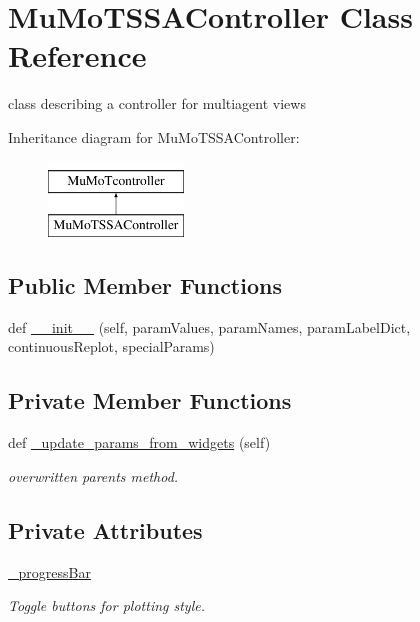 \hypertarget{class_mu_mo_t_1_1_mu_mo_t_s_s_a_controller}{}\section{Mu\+Mo\+T\+S\+S\+A\+Controller Class Reference}
\label{class_mu_mo_t_1_1_mu_mo_t_s_s_a_controller}


class describing a controller for multiagent views  


Inheritance diagram for Mu\+Mo\+T\+S\+S\+A\+Controller\+:\begin{figure}[H]
\begin{center}
\leavevmode
\includegraphics[height=2.000000cm]{class_mu_mo_t_1_1_mu_mo_t_s_s_a_controller}
\end{center}
\end{figure}
\subsection*{Public Member Functions}
\begin{DoxyCompactItemize}
\item 
def \hyperlink{class_mu_mo_t_1_1_mu_mo_t_s_s_a_controller_a203e76c007a565312c5715712851aadb}{\+\_\+\+\_\+init\+\_\+\+\_\+} (self, param\+Values, param\+Names, param\+Label\+Dict, continuous\+Replot, special\+Params)
\end{DoxyCompactItemize}
\subsection*{Private Member Functions}
\begin{DoxyCompactItemize}
\item 
def \hyperlink{class_mu_mo_t_1_1_mu_mo_t_s_s_a_controller_add4eacb8e812feeca1d4b2538e3bd6e0}{\+\_\+update\+\_\+params\+\_\+from\+\_\+widgets} (self)
\begin{DoxyCompactList}\small\item\em overwritten parent\textquotesingle{}s method. \end{DoxyCompactList}\end{DoxyCompactItemize}
\subsection*{Private Attributes}
\begin{DoxyCompactItemize}
\item 
\hyperlink{class_mu_mo_t_1_1_mu_mo_t_s_s_a_controller_a018864aa22d2adb0d3958fb0adbce8e2}{\+\_\+progress\+Bar}
\begin{DoxyCompactList}\small\item\em Toggle buttons for plotting style. \end{DoxyCompactList}\end{DoxyCompactItemize}
